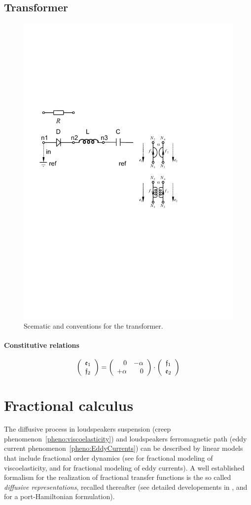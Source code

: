 \documentclass[10pt,a4paper]{article}
\begin{document}
{\subsection{Transformer}
\begin{figure}
\centering
\includegraphics[width=0.3\linewidth]{figures/transformater_scematic.pdf} 
\caption{Scematic and conventions for the transformer.}
\end{figure}
%
\paragraph{Constitutive relations}
$$
\left(
\begin{array}{c}
\mathfrak{e}_1\\
\mathfrak{f}_2
\end{array}
\right)
=
\left(
\begin{array}{rr}
0 & -\alpha \\
+ \alpha  & 0
\end{array}
\right)
\cdot
\left(
\begin{array}{c}
\mathfrak{f}_1\\
\mathfrak{e}_2
\end{array}
\right)
$$
%
\section{Fractional calculus}
\label{sec:fractional_calculus}
%
The diffusive process in loudspeakers suspension (creep phenomenon~\ref{pheno:viscoelasticity}) and loudspeakers ferromagnetic path (eddy current phenomenon~\ref{pheno:EddyCurrents}) can be described by linear models that include fractional order dynamics (see \cite{koeller1984applications, lewandowski2010identification, hu2011modal, Holm2013621} for fractional modeling of viscoelasticity, and \cite{schafer2008modelling, laudebat2003modelisation, rumeau2009modelisation} for fractional modeling of eddy currents).
%
A well established formalism for the realization of fractional transfer functions is the so called \emph{diffusive representations}, recalled thereafter (see detailed developements in \cite{helie2006representations,helie2006diffusive}, and \cite{le2012diffusive} for a port-Hamiltonian formulation).
%
%
%
%
%
%
%
%
%
%
%
%
%
%
%
%
%
%
%
%
%
%
}
\end{document}

